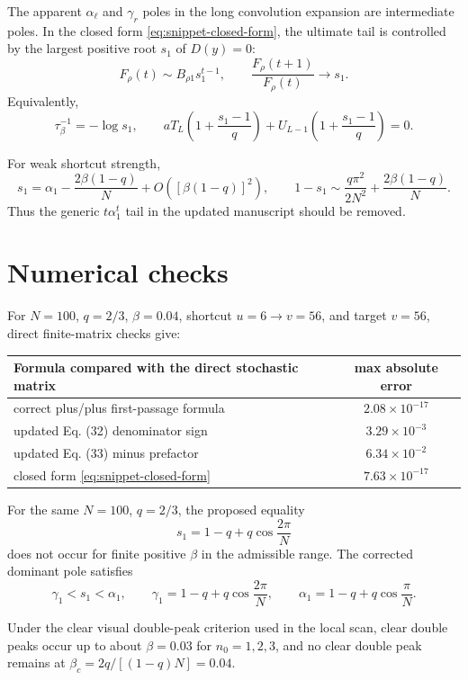 \documentclass[11pt]{article}
\begin{document}
The apparent \(\alpha_\ell\) and \(\gamma_r\) poles in the long convolution
expansion are intermediate poles.  In the closed form
\eqref{eq:snippet-closed-form}, the ultimate tail is controlled by the largest
positive root \(s_1\) of \(D(y)=0\):
\begin{equation}
  \boxed{
  F_\rho(t)\sim B_{\rho1}s_1^{t-1},
  \qquad
  \frac{F_\rho(t+1)}{F_\rho(t)}\to s_1
  }.
  \label{eq:snippet-tail}
\end{equation}
Equivalently,
\begin{equation}
  \boxed{
  \tau_\beta^{-1}=-\log s_1,\qquad
  aT_L\left(1+\frac{s_1-1}{q}\right)
  +
  U_{L-1}\left(1+\frac{s_1-1}{q}\right)=0
  }.
  \label{eq:snippet-decay-rate}
\end{equation}

For weak shortcut strength,
\begin{equation}
  s_1
  =
  \alpha_1-\frac{2\beta(1-q)}{N}
  +O\!\left([\beta(1-q)]^2\right),
  \qquad
  1-s_1
  \sim
  \frac{q\pi^2}{2N^2}
  +
  \frac{2\beta(1-q)}{N}.
  \label{eq:snippet-weak-beta}
\end{equation}
Thus the generic \(t\alpha_1^t\) tail in the updated manuscript should be
removed.

\section*{Numerical checks}

For \(N=100\), \(q=2/3\), \(\beta=0.04\), shortcut \(u=6\to v=56\), and target
\(v=56\), direct finite-matrix checks give:
\begin{center}
\begin{tabular}{lc}
\toprule
Formula compared with the direct stochastic matrix & max absolute error \\
\midrule
correct plus/plus first-passage formula & \(2.08\times10^{-17}\) \\
updated Eq. (32) denominator sign & \(3.29\times10^{-3}\) \\
updated Eq. (33) minus prefactor & \(6.34\times10^{-2}\) \\
closed form \eqref{eq:snippet-closed-form} & \(7.63\times10^{-17}\) \\
\bottomrule
\end{tabular}
\end{center}

For the same \(N=100\), \(q=2/3\), the proposed equality
\[
  s_1=1-q+q\cos\frac{2\pi}{N}
\]
does not occur for finite positive \(\beta\) in the admissible range.  The
corrected dominant pole satisfies
\[
  \gamma_1<s_1<\alpha_1,
  \qquad
  \gamma_1=1-q+q\cos\frac{2\pi}{N},
  \qquad
  \alpha_1=1-q+q\cos\frac{\pi}{N}.
\]

Under the clear visual double-peak criterion used in the local scan, clear
double peaks occur up to about \(\beta=0.03\) for \(n_0=1,2,3\), and no clear
double peak remains at \(\beta_c=2q/[(1-q)N]=0.04\).
\end{document}
